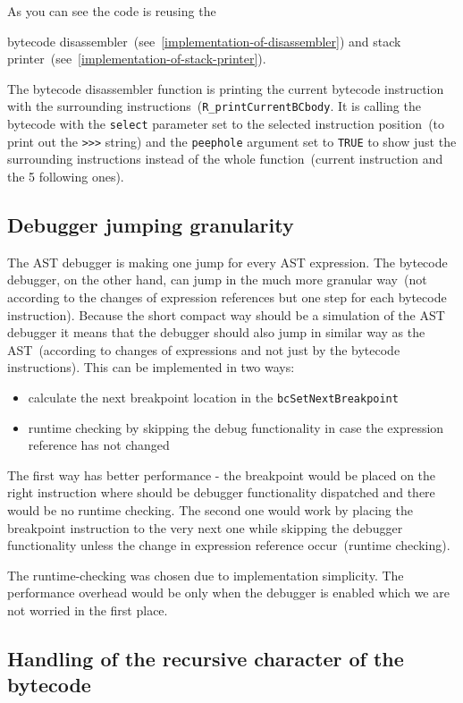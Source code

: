 \documentclass[thesis=M,english]{FITthesis}[2018/10/20]
\newcommand{\code}[1]{\texttt{#1}}
\begin{document}
As you can see the code is reusing the {bytecode disassembler~(see~\ref{implementation-of-disassembler}) and stack printer~(see~\ref{implementation-of-stack-printer}).

The bytecode disassembler function is printing the current bytecode instruction with the surrounding instructions~(\code{R{\_}printCurrentBCbody}. It is calling the bytecode  with the \code{select} parameter set to the selected instruction position~(to print out the \code{>>>} string) and the \code{peephole} argument set to \code{TRUE} to show just the surrounding instructions instead of the whole function~(current instruction and the 5 following ones).

\subsection{Debugger jumping granularity}\label{debugger-jumping-granuality}

The AST debugger is making one jump for every AST expression. The bytecode debugger, on the other hand, can jump in the much more granular way~(not according to the changes of expression references but one step for each bytecode instruction). Because the short compact way should be a simulation of the AST debugger it means that the debugger should also jump in similar way as the AST~(according to changes of expressions and not just by the bytecode instructions). This can be implemented in two ways:

\begin{itemize}
	\item calculate the next breakpoint location in the \code{bcSetNextBreakpoint}
	\item runtime checking by skipping the debug functionality in case the expression reference has not changed
\end{itemize}

The first way has better performance - the breakpoint would be placed on the right instruction where should be debugger functionality dispatched and there would be no runtime checking. The second one would work by placing the breakpoint instruction to the very next one while skipping the debugger functionality unless the change in expression reference occur~(runtime checking).

The runtime-checking was chosen due to implementation simplicity. The performance overhead would be only when the debugger is enabled which we are not worried in the first place.

\subsection{Handling of the recursive character of the bytecode}

}
\end{document}
